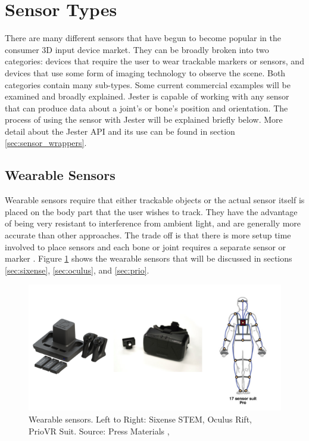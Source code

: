 \section{Sensor Types}

There are many different sensors that have begun to become popular in the consumer 3D input device market. They can be broadly broken into two categories: devices that require the user to wear trackable markers or sensors, and devices that use some form of imaging technology to observe the scene. Both categories contain many sub-types. Some current commercial examples will be examined and broadly explained. Jester is capable of working with any sensor that can produce data about a joint’s or bone’s position and orientation. The process of using the sensor with Jester will be explained briefly below. More detail about the Jester API and its use can be found in section \ref{sec:sensor_wrappers}. 

\subsection{Wearable Sensors}

Wearable sensors require that either trackable objects or the actual sensor itself is placed on the body part that the user wishes to track. They have the advantage of being very resistant to interference from ambient light, and are generally more accurate than other approaches. The trade off is that there is more setup time involved to place sensors and each bone or joint requires a separate sensor or marker \cite{zhu2004real}. Figure \ref{fig:wearables} shows the wearable sensors that will be discussed in sections \ref{sec:sixense}, \ref{sec:oculus}, and \ref{sec:prio}. 

\begin{figure}[h]
\centering
\includegraphics[width=1\textwidth]{figures/wearables}
\caption{Wearable sensors. Left to Right: Sixense STEM, Oculus Rift, PrioVR Suit. Source: Press Materials \cite{sixense_stem} \cite{oculus2012oculus}, \cite{priovr}}
\label{fig:wearables}
\end{figure}

